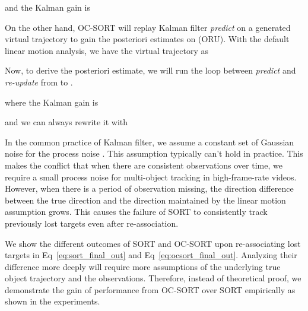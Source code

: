 \documentclass[10pt,twocolumn,letterpaper]{article}
\begin{document}
and the Kalman gain is 


On the other hand, OC-SORT will replay Kalman filter \textit{predict} on a generated virtual trajectory to gain the posteriori estimates on  (ORU). With the default linear motion analysis, we have the virtual trajectory as

Now, to derive the posteriori estimate, we will run the loop between \textit{predict} and \textit{re-update} from  to .
  
where the Kalman gain is 

and we can always rewrite it with 

In the common practice of Kalman filter, we assume a constant set of Gaussian noise for the process noise . This assumption typically can't hold in practice. This makes the conflict that when there are consistent observations over time, we require a small process noise for multi-object tracking in high-frame-rate videos. However, when there is a period of observation missing, the direction difference between the true direction and the direction maintained by the linear motion assumption grows. This causes the failure of SORT to consistently track previously lost targets even after re-association.

We show the different outcomes of SORT and OC-SORT upon re-associating lost targets in Eq~\ref{eq:sort_final_out} and Eq~\ref{eq:ocsort_final_out}. Analyzing their difference more deeply will require more assumptions of the underlying true object trajectory and the observations. Therefore, instead of theoretical proof, we demonstrate the gain of performance from OC-SORT over SORT empirically as shown in the experiments.
\end{document}
